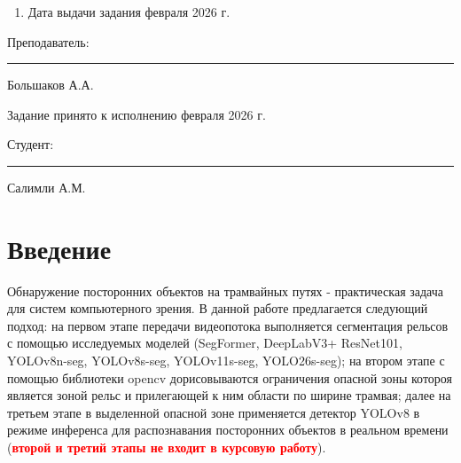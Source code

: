 \documentclass[areasetadvanced]{scrartcl}
\begin{document}
\begin{enumerate}[label=\arabic*., ref=\arabic*]
\begin{enumerate}[label=\arabic{enumi}.\arabic*., ref=\arabic{enumi}.\arabic*]
        \item Компьютерное зрение и задача сегментации
        \item Сегментатор SegFormer
        \item Сегментатор DeepLabV3+ ResNet101
        \item Сегментатор YOLO-seg
        \item Подбор гиперпараметров методом эволюционной стратегии
        \item Выбор метода минимизации функции потерь
        \item Обучение сегментатора
        \item Анализ результатов
        \item Заключение
    \end{enumerate}
    \item Дата выдачи задания \guillemotright февраля 2026 г.
\end{enumerate}

Преподаватель: \hspace{0.55cm} \rule[0pt]{2.5cm}{0.5pt}\hfill Большаков А.А.

Задание принято к исполнению \guillemotright февраля 2026 г.

Студент: \hspace{0.55cm} \rule[0pt]{2.5cm}{0.5pt}\hfill Салимли А.М.


\newpage
\tableofcontents

\newpage
\section*{Введение}

Обнаружение посторонних объектов на трамвайных путях - практическая задача для систем компьютерного зрения. В данной работе предлагается следующий подход: на первом этапе передачи видеопотока выполняется сегментация рельсов с помощью исследуемых моделей (SegFormer, DeepLabV3+ ResNet101, YOLOv8n-seg, YOLOv8s-seg, YOLOv11s-seg, YOLO26s-seg); на втором этапе с помощью библиотеки opencv дорисовываются ограничения опасной зоны котороя является зоной рельс и прилегающей к ним области по ширине трамвая; далее на третьем этапе в выделенной опасной зоне применяется детектор YOLOv8 в режиме инференса для распознавания посторонних объектов в реальном времени (\textbf{\textcolor{red}{второй и третий этапы не входит в курсовую работу}}).
\end{document}
